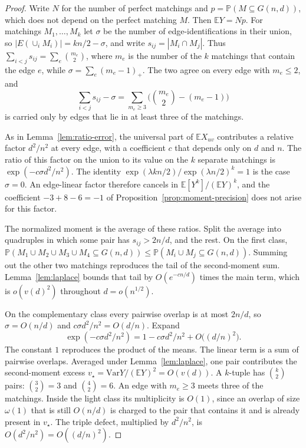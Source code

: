 \documentclass[11pt]{article}
\newcommand{\Gnd}{G(n,d)}
\newcommand{\EE}{\mathbb{E}}
\newcommand{\PP}{\mathbb{P}}
\newcommand{\Var}{\mathrm{Var}}
\begin{document}
\begin{proof}
Write \(N\) for the number of perfect matchings and \(p=\PP(M\subseteq\Gnd)\),
which does not depend on the perfect matching \(M\). Then \(\EE Y=Np\).
For matchings \(M_1,\ldots,M_k\) let \(\sigma\) be the number of edge-identifications
in their union, so \(|E(\cup_i M_i)|=kn/2-\sigma\), and write \(s_{ij}=|M_i\cap M_j|\).
Thus \(\sum_{i<j}s_{ij}=\sum_e\binom{m_e}{2}\), where \(m_e\) is the number of the
\(k\) matchings that contain the edge \(e\), while
\(\sigma=\sum_e(m_e-1)_+\). The two agree on every edge with \(m_e\le 2\), and
\[
\sum_{i<j}s_{ij}-\sigma
=
\sum_{m_e\ge 3}\bigl(\binom{m_e}{2}-(m_e-1)\bigr)
\]
is carried only by edges that lie in at least three of the matchings.

As in Lemma~\ref{lem:ratio-error}, the universal part of \(\EE X_{uv}\) contributes
a relative factor \(d^2/n^2\) at every edge, with a coefficient \(c\) that depends
only on \(d\) and \(n\). The ratio of this factor on the union to its value on the
\(k\) separate matchings is \(\exp(-c\sigma d^2/n^2)\). The identity
\(\exp(\lambda kn/2)/\exp(\lambda n/2)^k=1\) is the case \(\sigma=0\).
An edge-linear factor therefore cancels in \(\EE[Y^k]/(\EE Y)^k\), and the
coefficient \(-3+8-6=-1\) of Proposition~\ref{prop:moment-precision} does not
arise for this factor.

The normalized moment is the average of these ratios. Split the average into
quadruples in which some pair has \(s_{ij}>2n/d\), and the rest.
On the first class, \(\PP(M_1\cup M_2\cup M_3\cup M_4\subseteq\Gnd)\le\PP(M_i\cup M_j\subseteq\Gnd)\).
Summing out the other two matchings reproduces the tail of the second-moment sum.
Lemma~\ref{lem:laplace} bounds that tail by \(O(e^{-cn/d})\) times the main term,
which is \(o(v(d)^2)\) throughout \(d=o(n^{1/2})\).

On the complementary class every pairwise overlap is at most \(2n/d\), so
\(\sigma=O(n/d)\) and \(c\sigma d^2/n^2=O(d/n)\). Expand
\[
\exp(-c\sigma d^2/n^2)
=
1-c\sigma d^2/n^2+O\bigl((d/n)^2\bigr).
\]
The constant \(1\) reproduces the product of the means. The linear term is a sum
of pairwise overlaps. Averaged under Lemma~\ref{lem:laplace}, one pair
contributes the second-moment excess \(v_\star=\Var Y/(\EE Y)^2=O(v(d))\).
A \(k\)-tuple has \(\binom{k}{2}\) pairs: \(\binom{3}{2}=3\) and \(\binom{4}{2}=6\).
An edge with \(m_e\ge 3\) meets three of the matchings. Inside the light class its
multiplicity is \(O(1)\), since an overlap of size \(\omega(1)\) that is still
\(O(n/d)\) is charged to the pair that contains it and is already present in
\(v_\star\). The triple defect, multiplied by \(d^2/n^2\), is
\(O(d^2/n^2)=O((d/n)^2)\).


\end{proof}
\end{document}
